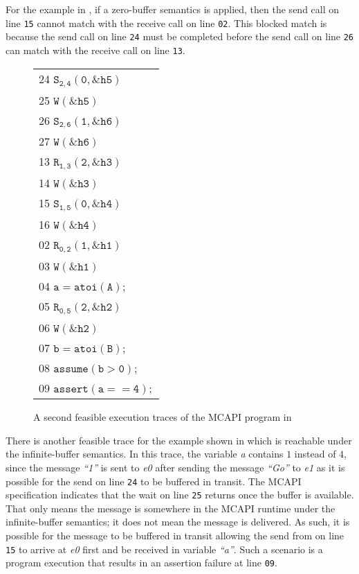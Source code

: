 For the example in , if a zero-buffer
semantics is applied, then the send call on line \texttt{15} cannot match
with the receive call on line \texttt{02}. This blocked match is because
the send call on line \texttt{24} must be completed before
the send call on line \texttt{26} can match with the receive
call on line \texttt{13}.

\begin{figure}[h]
\begin{center}
\setlength{\tabcolsep}{2pt}
\scriptsize \begin{tabular}[t]{l}
24 $\mathtt{S_{2,4}(0,\&h5)}$ \\
25 $\mathtt{W(\&h5)}$ \\
26 $\mathtt{S_{2,6}(1,\&h6)}$ \\
27 $\mathtt{W(\&h6)}$ \\
\hline
13 $\mathtt{R_{1,3}(2,\&h3)}$ \\
14 $\mathtt{W(\&h3)}$ \\
15 $\mathtt{S_{1,5}(0,\&h4)}$ \\
16 $\mathtt{W(\&h4)}$ \\
\hline
02 $\mathtt{R_{0,2}(1,\&h1)}$ \\
03 $\mathtt{W(\&h1)}$ \\
04 $\mathtt{a = atoi(A);}$ \\
05 $\mathtt{R_{0,5}(2,\&h2)}$\\
06 $\mathtt{W(\&h2)}$ \\
07 $\mathtt{b = atoi(B);}$ \\
08 $\mathtt{assume (b > 0);}$ \\
09 $\mathtt{assert(a == 4);}$ \\
\hline
\end{tabular}
\end{center}
\caption{A second feasible  execution traces of the MCAPI program in }
\label{fig:trace2}
\end{figure}

There is another feasible trace for the example shown in
 which is reachable under the infinite-buffer
semantics. In this trace, the variable \textit{a} contains $1$ instead
of $4$, since the message \textit{``1''} is sent to \textit{e0} after
sending the message \textit{``Go''} to \textit{e1} as it is possible
for the send on line \texttt{24} to be buffered in transit. The MCAPI
specification indicates that the wait on line \texttt{25} returns once
the buffer is available. That only means the message is somewhere in
the MCAPI runtime under the infinite-buffer semantics; it does not
mean the message is delivered. As such, it is possible for the message
to be buffered in transit allowing the send from on line \texttt{15}
to arrive at \textit{e0} first and be received in variable
\textit{``a''}. Such a scenario is a program execution that results in
an assertion failure at line \texttt{09}.

